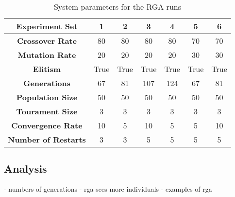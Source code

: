 \begin{table}
	\label{table:viability-rga}
	\centering
	\begin{tabular}{ | >{\bfseries}c | c | c | c | c | c | c | }
		\hline
		Experiment Set & 1 & 2 & 3 & 4 & 5 & 6 \\ \hline
		Crossover Rate & 80 & 80 & 80 & 80 & 70 & 70 \\ \hline
		Mutation Rate & 20 & 20 & 20 & 20 & 30 & 30 \\ \hline
		Elitism & True & True & True & True & True & True \\ \hline
		Generations & 67 & 81 & 107 & 124 & 67 & 81 \\ \hline
		Population Size & 50 & 50 & 50 & 50 & 50 & 50 \\ \hline
		Tourament Size & 3 & 3 & 3 & 3 & 3 & 3 \\ \hline
		Convergence Rate & 10 & 5 & 10 & 5 & 5 & 10 \\ \hline
		Number of Restarts & 3 & 3 & 5 & 5 & 5 & 5 \\ \hline
	\end{tabular}
	\caption{System parameters for the RGA runs}
\end{table}

\subsection{Analysis}

- numbers of generations
- rga sees more individuals
- examples of rga